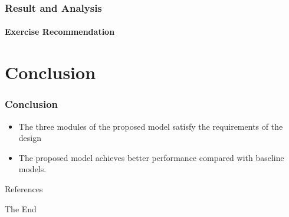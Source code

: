 \documentclass{beamer}
\begin{document}
\begin{frame}
	\frametitle{Result and Analysis}
	\framesubtitle{Exercise Recommendation}
	\begin{table}[htb]
		\caption{The performance comparison between baseline and proposed recommendation models.}\label{tbl:ch4-exp-result}
		\centering
	\end{table}
\end{frame}


\section{Conclusion}
\begin{frame}
	\frametitle{Conclusion}
	\begin{itemize}
		\item The three modules of the proposed model satisfy the requirements of the design
		\item The proposed model achieves better performance compared with baseline models.
	\end{itemize}
\end{frame}

\begin{frame}[allowframebreaks]{References}
	
	
\end{frame}


\begin{frame}
	\Huge{\centerline{The End}}
\end{frame}

\end{document}

